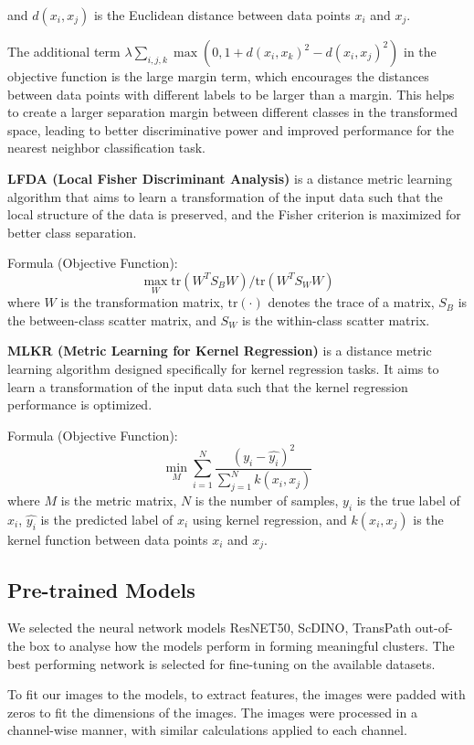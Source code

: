 \documentclass[12pt,a4paper]{article}
\begin{document}
and \(d(x_i, x_j)\) is the Euclidean distance between data points \(x_i\) and \(x_j\).

The additional term \(\lambda \sum_{i,j,k} \max(0, 1 + d(x_i, x_k)^2 - d(x_i, x_j)^2)\) in the objective function is the large margin term, which encourages the distances between data points with different labels to be larger than a margin. This helps to create a larger separation margin between different classes in the transformed space, leading to better discriminative power and improved performance for the nearest neighbor classification task.

\textbf{LFDA (Local Fisher Discriminant Analysis)}
is a distance metric learning algorithm that aims to learn a transformation of the input data such that the local structure of the data is preserved, and the Fisher criterion is maximized for better class separation.

Formula (Objective Function):
\[
\max_{W} \text{tr}(W^T S_B W) / \text{tr}(W^T S_W W)
\]
where \(W\) is the transformation matrix, \(\text{tr}(\cdot)\) denotes the trace of a matrix, \(S_B\) is the between-class scatter matrix, and \(S_W\) is the within-class scatter matrix.

\textbf{MLKR (Metric Learning for Kernel Regression)}
is a distance metric learning algorithm designed specifically for kernel regression tasks. It aims to learn a transformation of the input data such that the kernel regression performance is optimized.

Formula (Objective Function):
\[
\min_{M} \sum_{i=1}^{N} \frac{(y_i - \hat{y_i})^2}{\sum_{j=1}^{N} k(x_i, x_j)}
\]
where \(M\) is the metric matrix, \(N\) is the number of samples, \(y_i\) is the true label of \(x_i\), \(\hat{y_i}\) is the predicted label of \(x_i\) using kernel regression, and \(k(x_i, x_j)\) is the kernel function between data points \(x_i\) and \(x_j\).


\subsection{Pre-trained Models}
We selected the neural network models ResNET50, ScDINO, TransPath out-of-the box to analyse how the models perform in forming meaningful clusters. The best performing network is selected for fine-tuning on the available datasets.

To fit our images to the models, to extract features, the images were padded with zeros to fit the dimensions of the images. The images were processed in a channel-wise manner, with similar calculations applied to each channel.
\end{document}
